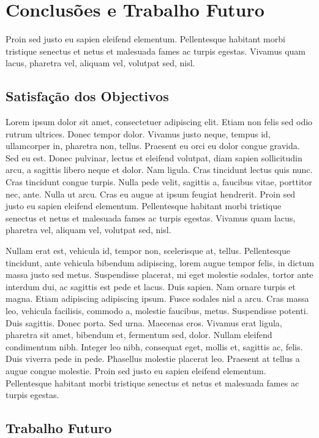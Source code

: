 \chapter{Conclusões e Trabalho Futuro} \label{chap:concl}

Proin sed justo eu sapien eleifend elementum. Pellentesque
habitant morbi tristique senectus et netus et malesuada fames ac
turpis egestas. Vivamus quam lacus, pharetra vel, aliquam vel,
volutpat sed, nisl. 

\section{Satisfação dos Objectivos}

Lorem ipsum dolor sit amet, consectetuer adipiscing elit. Etiam non
felis sed odio rutrum ultrices. Donec tempor dolor. Vivamus justo
neque, tempus id, ullamcorper in, pharetra non, tellus. Praesent eu
orci eu dolor congue gravida. Sed eu est. Donec pulvinar, lectus et
eleifend volutpat, diam sapien sollicitudin arcu, a sagittis libero
neque et dolor. Nam ligula. Cras tincidunt lectus quis nunc. Cras
tincidunt congue turpis. Nulla pede velit, sagittis a, faucibus vitae,
porttitor nec, ante. Nulla ut arcu. Cras eu augue at ipsum feugiat
hendrerit. Proin sed justo eu sapien eleifend elementum. Pellentesque
habitant morbi tristique senectus et netus et malesuada fames ac
turpis egestas. Vivamus quam lacus, pharetra vel, aliquam vel,
volutpat sed, nisl. 

Nullam erat est, vehicula id, tempor non, scelerisque at,
tellus. Pellentesque tincidunt, ante vehicula bibendum adipiscing,
lorem augue tempor felis, in dictum massa justo sed metus. Suspendisse
placerat, mi eget molestie sodales, tortor ante interdum dui, ac
sagittis est pede et lacus. Duis sapien. Nam ornare turpis et
magna. Etiam adipiscing adipiscing ipsum. Fusce sodales nisl a
arcu. Cras massa leo, vehicula facilisis, commodo a, molestie
faucibus, metus. Suspendisse potenti. Duis sagittis. Donec porta. Sed
urna. Maecenas eros. Vivamus erat ligula, pharetra sit amet, bibendum
et, fermentum sed, dolor. Nullam eleifend condimentum nibh. Integer
leo nibh, consequat eget, mollis et, sagittis ac, felis. Duis viverra
pede in pede. Phasellus molestie placerat leo. Praesent at tellus a
augue congue molestie. Proin sed justo eu sapien eleifend
elementum. Pellentesque habitant morbi tristique senectus et netus et
malesuada fames ac turpis egestas. 

\section{Trabalho Futuro}

